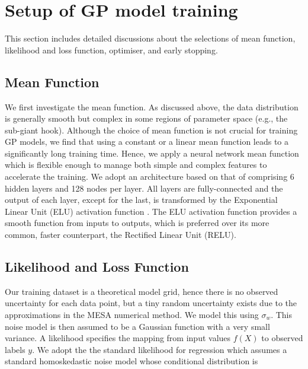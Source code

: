 \appendix{}

\section{Setup of GP model training}\label{app:A}

This section includes detailed discussions about the selections of mean function, likelihood and loss function, optimiser, and early stopping. 

\subsection{Mean Function}

We first investigate the mean function. As discussed above, the data distribution is generally smooth but complex in some regions of parameter space (e.g., the sub-giant hook).  Although the choice of mean function is not crucial for training GP models, we find that using a constant or a linear mean function leads to a significantly long training time. Hence, we apply a neural network mean function which is flexible enough to manage both simple and complex features to accelerate the training. We adopt an architecture based on that of  \citet{2021MNRAS.tmp.1343L} comprising 6 hidden layers and 128 nodes per layer. All layers are fully-connected and the output of each layer, except for the last, is transformed by the Exponential Linear Unit (ELU) activation function \cite{2015arXiv151107289C}. The ELU activation function provides a smooth function from inputs to outputs, which is preferred over its more common, faster counterpart, the Rectified Linear Unit (RELU).



\subsection{Likelihood and Loss Function}

Our training dataset is a theoretical model grid,  hence there is no observed uncertainty for each data point, but a tiny random uncertainty exists due to the approximations in the \textsc{MESA} numerical method. We model this using $\sigma_{w}$.  This noise model is then assumed to be a Gaussian function with a very small variance.  
%   
A likelihood specifies the mapping from input values $f(X)$ to observed labels $y$.
We adopt the the standard likelihood for regression which assumes a standard homoskedastic noise model whose conditional distribution is

